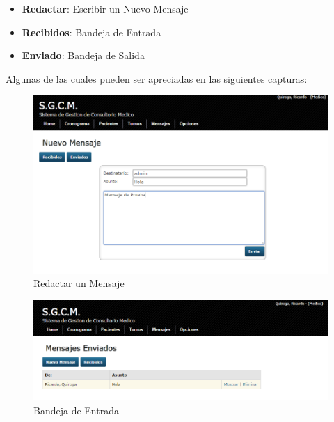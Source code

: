 \begin{itemize}
    \item \textbf{Redactar}: Escribir un Nuevo Mensaje
    \item \textbf{Recibidos}: Bandeja de Entrada
    \item \textbf{Enviado}: Bandeja de Salida
\end{itemize}

Algunas de las cuales pueden ser apreciadas en las siguientes capturas:

\begin{figure}[H]
    \centering
    \includegraphics[scale=0.5]{resourse/mensaje-redactar.png}
    \caption{Redactar un Mensaje}
    \label{fig:610}
\end{figure}

\begin{figure}[H]
    \centering
    \includegraphics[scale=0.5]{resourse/mensaje-recibidos.png}
    \caption{Bandeja de Entrada}
    \label{fig:611}
\end{figure}

